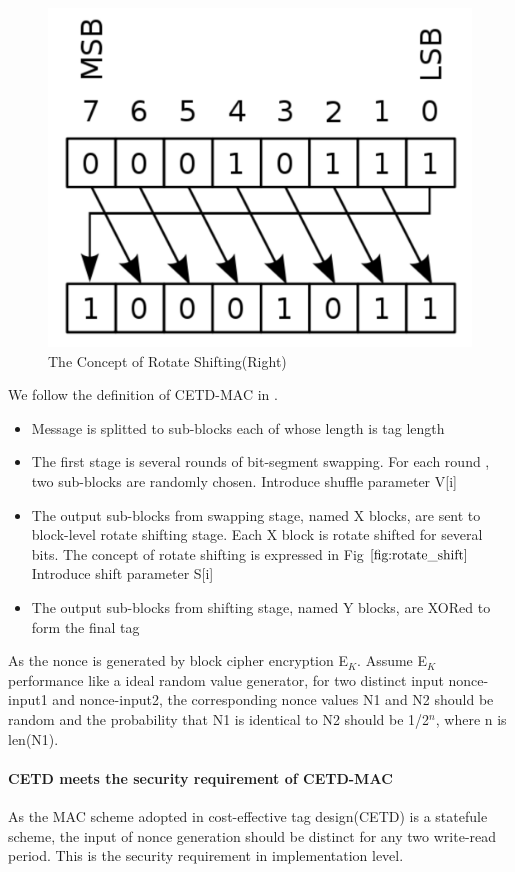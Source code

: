 \documentclass{article}
\begin{document}
\begin{figure}[htbp]
 \centering
 \includegraphics[scale=0.4]{./diagrams/rotate_right.pdf}
 \caption{The Concept of Rotate Shifting(Right)}
 \label{fig:rotate_shift}
\end{figure}
We follow the definition of CETD-MAC in \cite{keylist}. 
\begin{itemize}
	\item Message is splitted to sub-blocks each of whose length is tag length
	\item The first stage is several rounds of bit-segment swapping. For each round , two sub-blocks are randomly chosen. Introduce shuffle parameter V[i]
	\item The output sub-blocks from swapping stage, named X blocks, are sent to block-level rotate shifting stage. Each X block is rotate shifted for several bits. The concept of rotate shifting is expressed in Fig $\ref{fig:rotate_shift}$ Introduce shift parameter S[i]
	\item The output sub-blocks from shifting stage, named Y blocks, are XORed to form the final tag
\end{itemize}
As the nonce is generated by block cipher encryption E$_K$. Assume E$_K$ performance like a ideal random value generator, for two distinct input nonce-input1 and nonce-input2, the corresponding nonce values N1 and N2 should be random and the probability that N1 is identical to N2 should be 1/2$^n$, where n is len(N1). 
\paragraph{CETD meets the security requirement of CETD-MAC}
As the MAC scheme adopted in cost-effective tag design(CETD) is a statefule scheme, the input of nonce generation should be distinct for any two write-read period. This is the security requirement in implementation level. 
\end{document}
